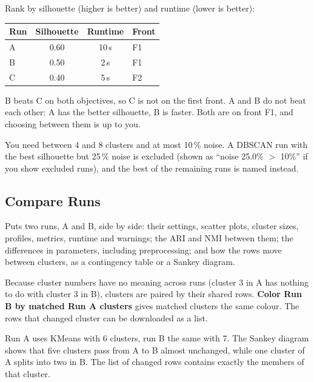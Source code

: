 \documentclass[11pt,a4paper]{article}
\newcommand{\ui}[1]{\textsf{\textbf{#1}}}   %
\begin{document}
\begin{example}
Rank by silhouette (higher is better) and runtime (lower is better):
\begin{center}
\begin{tabular}{lccl}
\toprule
Run & Silhouette & Runtime & Front\\
\midrule
A & 0.60 & 10\,s & F1\\
B & 0.50 & 2\,s & F1\\
C & 0.40 & 5\,s & F2\\
\bottomrule
\end{tabular}
\end{center}
B beats C on both objectives, so C is not on the first front. A and B do not beat each other: A has the better
silhouette, B is faster. Both are on front F1, and choosing between them is up to you.
\end{example}

\begin{example}[constraints]
You need between 4 and 8 clusters and at most 10\,\% noise. A DBSCAN run with the best silhouette but 25\,\% noise
is excluded (shown as ``noise 25.0\% $>$ 10\%'' if you show excluded runs), and the best of the remaining runs is
named instead.
\end{example}

\subsection{Compare Runs}

Puts two runs, A and B, side by side: their settings, scatter plots, cluster sizes, profiles, metrics, runtime and
warnings; the ARI and NMI between them; the differences in parameters, including preprocessing; and how the rows
move between clusters, as a contingency table or a Sankey diagram.

Because cluster numbers have no meaning across runs (cluster 3 in A has nothing to do with cluster 3 in B), clusters
are paired by their shared rows. \ui{Color Run B by matched Run A clusters} gives matched clusters the same colour.
The rows that changed cluster can be downloaded as a list.

\begin{example}
Run A uses KMeans with 6 clusters, run B the same with 7. The Sankey diagram shows that five clusters pass from A to
B almost unchanged, while one cluster of A splits into two in B. The list of changed rows contains exactly the
members of that cluster.
\end{example}
\end{document}
